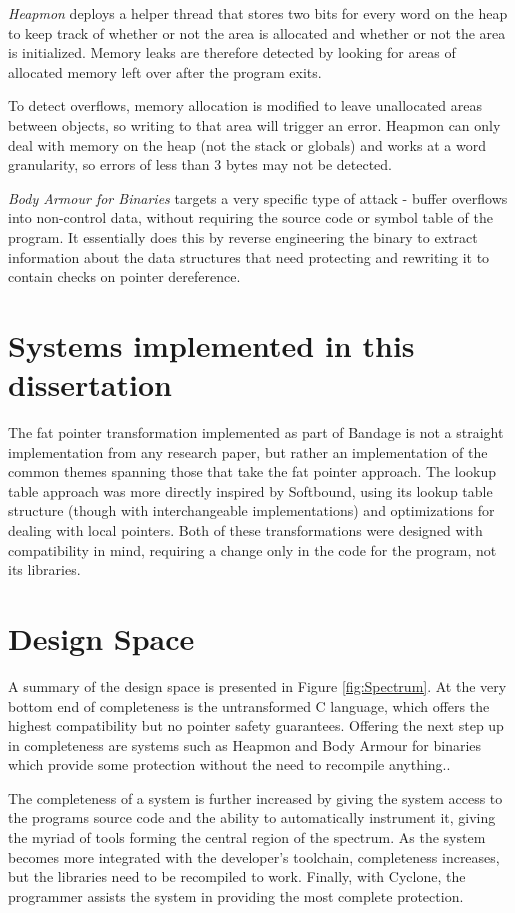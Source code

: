 \textit{Heapmon} \cite{shetty2005heapmon} deploys a helper thread that stores two bits for every word on the heap to keep track of whether or not the area is allocated and whether or not the area is initialized.
Memory leaks are therefore detected by looking for areas of allocated memory left over after the program exits.

To detect overflows, memory allocation is modified to leave unallocated areas between objects, so writing to that area will trigger an error.
Heapmon can only deal with memory on the heap (not the stack or globals) and works at a word granularity, so errors of less than 3 bytes may not be detected.

\textit{Body Armour for Binaries} \cite{slowinska2012body} targets a very specific type of attack - buffer overflows into non-control data, without requiring the source code or symbol table of the program.
It essentially does this by reverse engineering the binary to extract information about the data structures that need protecting and rewriting it to contain checks on pointer dereference.



\section{Systems implemented in this dissertation}

The fat pointer transformation implemented as part of Bandage is not a straight implementation from any research paper, but rather an implementation of the common themes spanning those that take the fat pointer approach.
The lookup table approach was more directly inspired by Softbound, using its lookup table structure (though with interchangeable implementations) and optimizations for dealing with local pointers.
Both of these transformations were designed with compatibility in mind, requiring a change only in the code for the program, not its libraries.

\section{Design Space}


A summary of the design space is presented in Figure \ref{fig:Spectrum}.
At the very bottom end of completeness is the untransformed C language, which offers the highest compatibility but no pointer safety guarantees.
Offering the next step up in completeness are systems such as Heapmon and Body Armour for binaries which provide some protection without the need to recompile anything..

The completeness of a system is further increased by giving the system access to the programs source code and the ability to automatically instrument it, giving the myriad of tools forming the central region of the spectrum.
As the system becomes more integrated with the developer's toolchain, completeness increases, but the libraries need to be recompiled to work.
Finally, with Cyclone, the programmer assists the system in providing the most complete protection.
